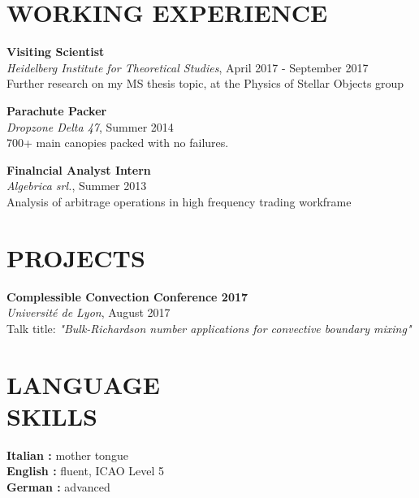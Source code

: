 \documentclass[margin]{res}
\begin{document}
\begin{resume}
\section{WORKING EXPERIENCE}

\textbf{Visiting Scientist}\\
{\sl Heidelberg Institute for Theoretical Studies}, April 2017 - September 2017\\
Further research on my MS thesis topic, at the Physics of Stellar Objects group

\textbf{Parachute Packer}\\
{\sl Dropzone Delta 47}, Summer 2014\\
700+ main canopies packed with no failures.

\textbf{Finalncial Analyst Intern}\\
{\sl Algebrica srl.}, Summer 2013\\
Analysis of arbitrage operations in high frequency trading workframe  

\section{PROJECTS}

\textbf{Complessible Convection Conference 2017}\\
{\sl Université de Lyon}, August 2017\\
Talk title: \textit{"Bulk-Richardson number applications for convective boundary mixing"}  


\section{LANGUAGE\\SKILLS}

\textbf{Italian : } mother tongue
\\
\textbf{English : } fluent, ICAO Level 5
\\
\textbf{German : } advanced


\end{resume}
\end{document}
